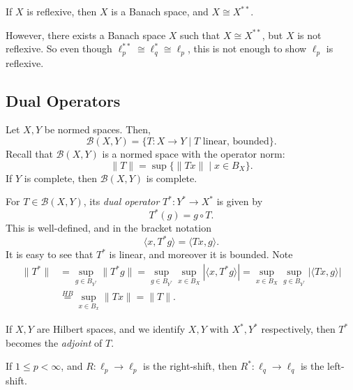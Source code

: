 \documentclass[12pt]{article}
\begin{document}
\begin{remark}
	If $X$ is reflexive, then $X$ is a Banach space, and $X \cong X^{\ast\ast}$.

	However, there exists a Banach space $X$ such that $X \cong X^{\ast\ast}$, but $X$ is not reflexive. So even though $\ell_p^{\ast\ast} \cong \ell_q^\ast \cong \ell_p$, this is not enough to show $\ell_p$ is reflexive.
\end{remark}



\subsection{Dual Operators}%
\label{sub:dual_op}

Let $X, Y$ be normed spaces. Then,
\[
	\mathcal{B}(X, Y) = \{T : X \to Y \mid T \text{ linear, bounded}\}.
\]
Recall that $\mathcal{B}(X, Y)$ is a normed space with the operator norm:
\[
	\|T\| = \sup \{ \|Tx\| \mid x \in B_X\}.
\]
If $Y$ is complete, then $\mathcal{B}(X, Y)$ is complete.

For $T \in \mathcal{B}(X, Y)$, its \emph{dual operator} $T^\ast : Y^\ast \to X^\ast$ is given by
\[
T^\ast(g) = g \circ T.
\]
This is well-defined, and in the bracket notation
\[
\langle x, T^\ast g \rangle = \langle T x, g \rangle.
\]
It is easy to see that $T^\ast$ is linear, and moreover it is bounded. Note
\begin{align*}
	\|T^\ast\| &= \sup_{g \in B_{Y^\ast}} \|T^\ast g\| = \sup_{g \in B_{Y^\ast}} \sup_{x \in B_X} | \langle x, T^\ast g \rangle| = \sup_{x \in B_X} \sup_{g \in B_{Y^\ast}} | \langle Tx, g \rangle | \\
		   &\overset{HB}= \sup_{x \in B_x} \|Tx\| = \|T\|.
\end{align*}

\begin{remark}
	If $X, Y$ are Hilbert spaces, and we identify $X, Y$ with $X^\ast, Y^\ast$ respectively, then $T^\ast$ becomes the \emph{adjoint} of $T$.
\end{remark}

\begin{exbox}
	If $1 \leq p < \infty$, and $R : \ell_p \to \ell_p$ is the right-shift, then $R^\ast : \ell_q \to \ell_q$ is the left-shift.
\end{exbox}
\end{document}
